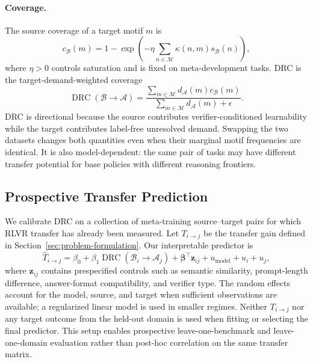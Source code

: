 \paragraph{Coverage.}
The source coverage of a target motif $m$ is
\begin{equation}
    c_{\mathcal{B}}(m)
    = 1-\exp\!\left(
        -\eta\sum_{n\in\mathcal{M}}
        \kappa(n,m)s_{\mathcal{B}}(n)
      \right),
\end{equation}
where $\eta>0$ controls saturation and is fixed on meta-development tasks.
DRC is the target-demand-weighted coverage
\begin{equation}
    \operatorname{DRC}(\mathcal{B}\!\rightarrow\!\mathcal{A})
    =
    \frac{
      \sum_{m\in\mathcal{M}} d_{\mathcal{A}}(m)c_{\mathcal{B}}(m)
    }{
      \sum_{m\in\mathcal{M}} d_{\mathcal{A}}(m)+\epsilon
    }.
    \label{eq:drc}
\end{equation}
DRC is directional because the source contributes verifier-conditioned
learnability while the target contributes label-free unresolved demand.
Swapping the two datasets changes both quantities even when their marginal
motif frequencies are identical.  It is also model-dependent: the same pair
of tasks may have different transfer potential for base policies with
different reasoning frontiers.

\subsection{Prospective Transfer Prediction}
\label{sec:transfer-prediction}

We calibrate DRC on a collection of meta-training source--target pairs for
which RLVR transfer has already been measured.  Let
$T_{i\rightarrow j}$ be the transfer gain defined in
Section~\ref{sec:problem-formulation}.  Our interpretable predictor is
\begin{equation}
    \widehat T_{i\rightarrow j}
    = \beta_0
      + \beta_1\operatorname{DRC}(\mathcal{B}_i\!\rightarrow\!\mathcal{A}_j)
      + \boldsymbol{\beta}^{\top}\mathbf{z}_{ij}
      + u_{\mathrm{model}}+u_i+u_j,
    \label{eq:transfer-predictor}
\end{equation}
where $\mathbf{z}_{ij}$ contains prespecified controls such as semantic
similarity, prompt-length difference, answer-format compatibility, and
verifier type.  The random effects account for the model, source, and target
when sufficient observations are available; a regularized linear model is
used in smaller regimes.  Neither $T_{i\rightarrow j}$ nor any target outcome
from the held-out domain is used when fitting or selecting the final predictor.
This setup enables prospective leave-one-benchmark and leave-one-domain
evaluation rather than post-hoc correlation on the same transfer matrix.

